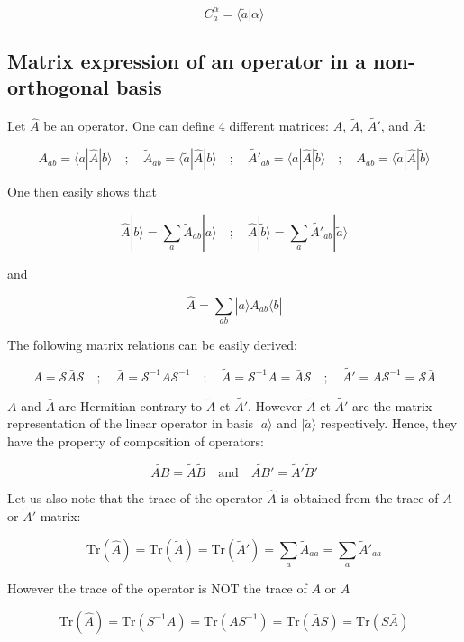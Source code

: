 \documentclass{article}
\newcommand{\bra}[1]{\langle #1|}
\newcommand{\ket}[1]{|#1\rangle}
\newcommand{\braket}[2]{\langle #1|#2\rangle}
\newcommand{\op}[1]{\hat{#1}}
\begin{document}
\[ C_a^{\alpha}= \braket{ \tilde{a}}{\alpha}\]


\subsection{Matrix expression of an operator in a non-orthogonal basis}

Let $\op{A}$ be an operator.
One can define 4 different matrices: $A$, $\tilde{A}$, $\tilde{A'}$, and $\bar{A}$:

\[  A_{ab}=\bra{a } \op{A} \ket{b} \quad ; \quad 
   \tilde{A}_{ab}=\bra{\tilde{a}} \op{A} \ket{b} \quad ; \quad
   \tilde{A'}_{ab}=\bra{a} \op{A} \ket{\tilde{b}} \quad ; \quad   
   \bar{A}_{ab}=\bra{\tilde{a}} \op{A} \ket{\tilde{b}} \]

One then easily shows that

\[ \op{A}\ket{b}=\sum_a \tilde{A}_{ab} \ket{a} \quad ; \quad 
   \op{A}\ket{\tilde{b}}=\sum_a \tilde{A'}_{ab} \ket{\tilde{a}}\]

and

\[ \op{A}=\sum_{ab} \ket{a}\bar{A}_{ab} \bra{b} \]


\noindent
The following matrix relations can be easily derived:

\[   A=\mathcal{S}\bar{A}\mathcal{S} \quad ; \quad 
    \bar{A}=\mathcal{S}^{-1}A\mathcal{S}^{-1} \quad ; \quad 
    \tilde{A}=\mathcal{S}^{-1}A=\bar{A}\mathcal{S} \quad ; \quad 
    \tilde{A'}=A\mathcal{S}^{-1}=\mathcal{S}\bar{A} \]

 
 \noindent
$A$ and $\bar{A}$ are Hermitian contrary to $\tilde{A}$ et $\tilde{A'}$. However  $\tilde{A}$ et $\tilde{A'}$ are the matrix representation of the linear operator in basis $\ket{a}$ and $\ket{\tilde{a}}$ respectively. Hence, they have the property of composition of operators:

\[ \widetilde{AB}=\tilde{A}\tilde{B} \quad \text{and} \quad  \widetilde{AB}'=\tilde{A}'\tilde{B}'\]

 \noindent
Let us also note that the trace of the operator $\op{A}$ is obtained from the trace of $\tilde{A}$ or $\tilde{A}'$ matrix:

\[\text{Tr}(\op{A})=\text{Tr}(\tilde{A})=\text{Tr}(\tilde{A}')=\sum_a \tilde{A}_{aa}=\sum_a \tilde{A}'_{aa}\]

 \noindent
However the trace of the operator is NOT the trace of $A$ or $\bar{A}$

\[\text{Tr}(\op{A})=\text{Tr}(S^{-1}A)=\text{Tr}(AS^{-1})=\text{Tr}(\bar{A}S)=\text{Tr}(S\bar{A})\]
\end{document}
